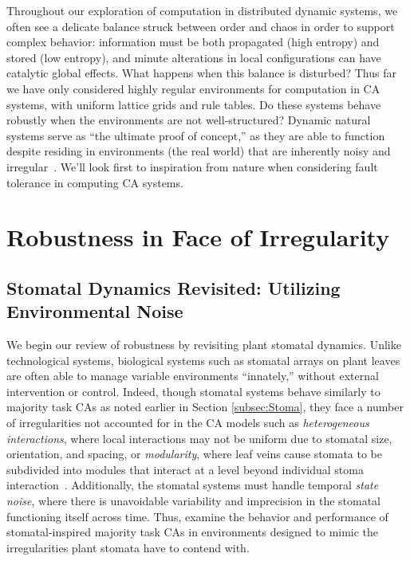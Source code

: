 \documentclass[a4paper,11pt]{report}
\begin{document}
Throughout our exploration of computation in distributed dynamic systems, we often see a delicate balance struck between order and chaos in order to support complex behavior: information must be both propagated (high entropy) and stored (low entropy), and minute alterations in local configurations can have catalytic global effects. What happens when this balance is disturbed? Thus far we have only considered highly regular environments for computation in CA systems, with uniform lattice grids and rule tables. Do these systems behave robustly when the environments are not well-structured? Dynamic natural systems serve as ``the ultimate proof of concept,'' as they are able to function despite residing in environments (the real world) that are inherently noisy and irregular~\cite{si99}. We'll look first to inspiration from nature when considering fault tolerance in computing CA systems. 



\section{Robustness in Face of Irregularity}
\label{sec:Robust}

\subsection{Stomatal Dynamics Revisited: Utilizing Environmental Noise}
We begin our review of robustness by revisiting plant stomatal dynamics. Unlike technological systems, biological systems such as stomatal arrays on plant leaves are often able to manage variable environments ``innately,'' without external intervention or control. Indeed, though stomatal systems behave similarly to majority task CAs as noted earlier in Section \ref{subsec:Stoma}, they face a number of irregularities not accounted for in the CA models such as \textit{heterogeneous interactions}, where local interactions may not be uniform due to stomatal size, orientation, and spacing,  or \textit{modularity}, where leaf veins cause stomata to be subdivided into modules that interact at a level beyond individual stoma interaction~\cite{me07}. Additionally, the stomatal systems must handle temporal \textit{state noise}, where there is unavoidable variability and imprecision in the stomatal functioning itself across time. Thus, \citeauthor{me07} examine the behavior and performance of stomatal-inspired majority task CAs in environments designed to mimic the irregularities plant stomata have to contend with.
\end{document}
